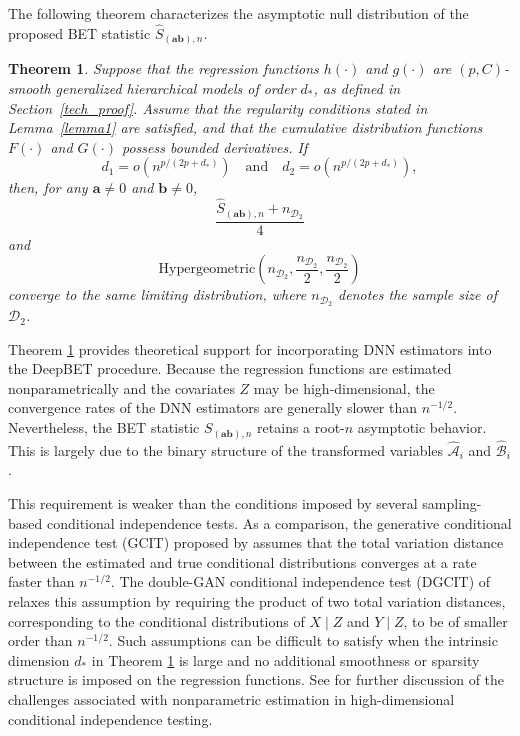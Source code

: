 \documentclass[12pt,reqno,oneside]{amsbook}
\newtheorem{theorem}{Theorem}[chapter]
\theoremstyle{definition}
\theoremstyle{remark}
\begin{document}
\hspace{0.5cm}
The following theorem characterizes the asymptotic null distribution of the proposed BET statistic $\hat{S}_{(\mathbf{ab}),n}$.

\begin{theorem}
\label{thm1}
Suppose that the regression functions $h(\cdot)$ and $g(\cdot)$ are $(p,C)$-smooth generalized hierarchical models of order $d_*$, as defined in Section~\ref{tech_proof}. Assume that the regularity conditions stated in Lemma~\ref{lemma1} are satisfied, and that the cumulative distribution functions $F(\cdot)$ and $G(\cdot)$ possess bounded derivatives. If
\[
d_1=o\!\left(n^{p/(2p+d_*)}\right)
\quad\text{and}\quad
d_2=o\!\left(n^{p/(2p+d_*)}\right),
\]
then, for any $\mathbf{a}\neq0$ and $\mathbf{b}\neq0$,
\[
\frac{\hat{S}_{(\mathbf{ab}),n}+n_{\mathcal{D}_2}}{4}
\]
and
\[
\mathrm{Hypergeometric}\!\left(n_{\mathcal{D}_2},
\frac{n_{\mathcal{D}_2}}{2},
\frac{n_{\mathcal{D}_2}}{2}\right)
\]
converge to the same limiting distribution, where $n_{\mathcal{D}_2}$ denotes the sample size of $\mathcal{D}_2$.
\end{theorem}

\hspace{0.5cm}
Theorem \ref{thm1} provides theoretical support for incorporating DNN estimators into the DeepBET procedure. Because the regression functions are estimated nonparametrically and the covariates $Z$ may be high-dimensional, the convergence rates of the DNN estimators are generally slower than $n^{-1/2}$. Nevertheless, the BET statistic $S_{(\mathbf{ab}),n}$ retains a root-$n$ asymptotic behavior. This is largely due to the binary structure of the transformed variables $\hat{\mathcal{A}}_i$ and $\hat{\mathcal{B}}_i$.

\hspace{0.5cm}
This requirement is weaker than the conditions imposed by several sampling-based conditional independence tests. As a comparison, the generative conditional independence test (GCIT) proposed by \cite{bellot2019conditional} assumes that the total variation distance between the estimated and true conditional distributions converges at a rate faster than $n^{-1/2}$. The double-GAN conditional independence test (DGCIT) of \cite{shi2021double} relaxes this assumption by requiring the product of two total variation distances, corresponding to the conditional distributions of $X\mid Z$ and $Y\mid Z$, to be of smaller order than $n^{-1/2}$. Such assumptions can be difficult to satisfy when the intrinsic dimension $d_*$ in Theorem \ref{thm1} is large and no additional smoothness or sparsity structure is imposed on the regression functions. See \cite{Shah_2020} for further discussion of the challenges associated with nonparametric estimation in high-dimensional conditional independence testing.
\end{document}
